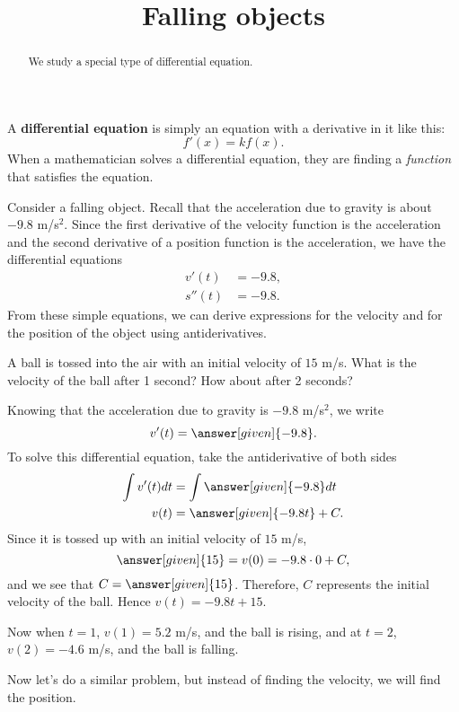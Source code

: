 \documentclass{ximera}
\title[Dig-In:]{Falling objects}
\begin{document}
\begin{abstract}
  We study a special type of differential equation.
\end{abstract}
\maketitle

A \textbf{differential equation} is simply an equation with a derivative in it like this:
\[
f'(x) = k f(x).
\]
When a mathematician solves a differential equation, they are finding
a \textit{function} that satisfies the equation.


Consider a falling object. Recall that the acceleration due to gravity is about $-9.8$
m/s$^2$. Since the first derivative of the velocity function 
is the acceleration and the
second derivative of a position function 
is the acceleration, we have the differential equations
\begin{align*}
v'(t) &=  -9.8,\\
s''(t) &=  -9.8.
\end{align*}
From these simple equations, we can derive expressions for the velocity
and for the position of the object using antiderivatives.


\begin{example}
A ball is tossed into the air with an initial velocity of $15$
m/s. What is the velocity of the ball after 1 second? How about after
2 seconds?
\begin{explanation}
Knowing that the acceleration due to gravity is $-9.8$ m/s$^2$, we write
\[
v'(t) = \answer[given]{-9.8}.
\]
To solve this differential equation, take the antiderivative of both sides
\begin{align*}
\int v'(t) dt &= \int \answer[given]{-9.8} dt\\
v(t) &= \answer[given]{-9.8 t} + C.
\end{align*}
 Since it is
tossed up with an initial velocity of $15$ m/s, 
\[
\answer[given]{15} = v(0) = -9.8\cdot 0 + C,
\]
and we see that $C=\answer[given]{15}$. Therefore, $C$ represents the initial velocity of the ball.
Hence $v(t) = -9.8t + 15$. 

Now when $t=1$,
$v(1) = 5.2$ m/s, and the ball is rising, and at $t=2$, $v(2) = -4.6$ m/s,
and the ball is falling.
\end{explanation}
\end{example}

Now let's do a similar problem, but instead of finding the velocity,
we will find the position.
\end{document}
